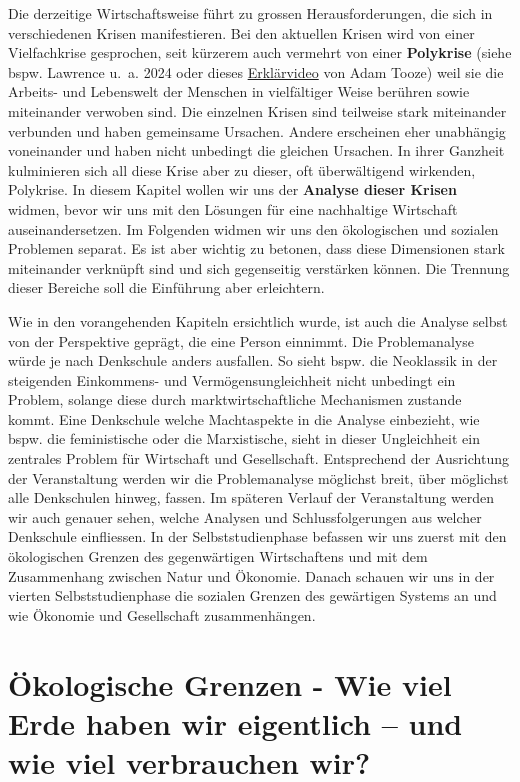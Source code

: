 \documentclass[
  nswissgerman,
  a4paper,
  DIV=11,
  numbers=noendperiod,
  oneside,
  openany]{scrreprt}
\begin{document}
Die derzeitige Wirtschaftsweise führt zu grossen Herausforderungen, die
sich in verschiedenen Krisen manifestieren. Bei den aktuellen Krisen
wird von einer Vielfachkrise gesprochen, seit kürzerem auch vermehrt von
einer \textbf{Polykrise} (siehe bspw. Lawrence u.~a. 2024 oder dieses
\href{https://www.weforum.org/videos/experts-explain-adam-tooze-what-is-the-polycrisis/}{Erklärvideo}
von Adam Tooze) weil sie die Arbeits- und Lebenswelt der Menschen in
vielfältiger Weise berühren sowie miteinander verwoben sind. Die
einzelnen Krisen sind teilweise stark miteinander verbunden und haben
gemeinsame Ursachen. Andere erscheinen eher unabhängig voneinander und
haben nicht unbedingt die gleichen Ursachen. In ihrer Ganzheit
kulminieren sich all diese Krise aber zu dieser, oft überwältigend
wirkenden, Polykrise. In diesem Kapitel wollen wir uns der
\textbf{Analyse dieser Krisen} widmen, bevor wir uns mit den Lösungen
für eine nachhaltige Wirtschaft auseinandersetzen. Im Folgenden widmen
wir uns den ökologischen und sozialen Problemen separat. Es ist aber
wichtig zu betonen, dass diese Dimensionen stark miteinander verknüpft
sind und sich gegenseitig verstärken können. Die Trennung dieser
Bereiche soll die Einführung aber erleichtern.

Wie in den vorangehenden Kapiteln ersichtlich wurde, ist auch die
Analyse selbst von der Perspektive geprägt, die eine Person einnimmt.
Die Problemanalyse würde je nach Denkschule anders ausfallen. So sieht
bspw. die Neoklassik in der steigenden Einkommens- und
Vermögensungleichheit nicht unbedingt ein Problem, solange diese durch
marktwirtschaftliche Mechanismen zustande kommt. Eine Denkschule welche
Machtaspekte in die Analyse einbezieht, wie bspw. die feministische oder
die Marxistische, sieht in dieser Ungleichheit ein zentrales Problem für
Wirtschaft und Gesellschaft. Entsprechend der Ausrichtung der
Veranstaltung werden wir die Problemanalyse möglichst breit, über
möglichst alle Denkschulen hinweg, fassen. Im späteren Verlauf der
Veranstaltung werden wir auch genauer sehen, welche Analysen und
Schlussfolgerungen aus welcher Denkschule einfliessen. In der
Selbststudienphase befassen wir uns zuerst mit den ökologischen Grenzen
des gegenwärtigen Wirtschaftens und mit dem Zusammenhang zwischen Natur
und Ökonomie. Danach schauen wir uns in der vierten Selbststudienphase
die sozialen Grenzen des gewärtigen Systems an und wie Ökonomie und
Gesellschaft zusammenhängen.

\section{Ökologische Grenzen - Wie viel Erde haben wir eigentlich -- und
wie viel verbrauchen
wir?}\label{uxf6kologische-grenzen---wie-viel-erde-haben-wir-eigentlich-und-wie-viel-verbrauchen-wir}
\end{document}
